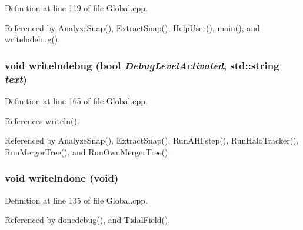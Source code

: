 Definition at line 119 of file Global.cpp.



Referenced by AnalyzeSnap(), ExtractSnap(), HelpUser(), main(), and writelndebug().

\subsubsection[{writelndebug}]{\setlength{\rightskip}{0pt plus 5cm}void writelndebug (bool {\em DebugLevelActivated}, \/  std::string {\em text})}\label{Global_8cpp_a5b25522225f9cc3d16b32059a125a93e}


Definition at line 165 of file Global.cpp.



References writeln().



Referenced by AnalyzeSnap(), ExtractSnap(), RunAHFstep(), RunHaloTracker(), RunMergerTree(), and RunOwnMergerTree().

\subsubsection[{writelndone}]{\setlength{\rightskip}{0pt plus 5cm}void writelndone (void)}\label{Global_8cpp_a6ea51689681a48365e4852a63687b8e6}


Definition at line 135 of file Global.cpp.



Referenced by donedebug(), and TidalField().

